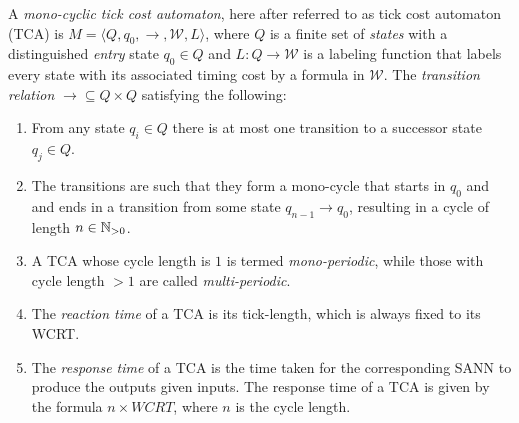\begin{definition}
	A \emph{mono-cyclic tick cost automaton}, here after referred to as tick cost automaton (\ac{TCA}) 
	is %
	$M = \langle Q, q_0, \rightarrow, \mathcal{W}, L
	\rangle$, where $Q$ is a finite set of \emph{states} with a
	distinguished \emph{entry} state $q_0 \in Q$ and $L: Q \rightarrow \mathcal{W}$ is
	a labeling function that labels every state with its associated timing cost by a formula in $\mathcal{W}$.
	The \emph{transition relation}
	${\rightarrow} \subseteq Q \times Q$ satisfying the following:
	
	\begin{enumerate}
		\item From any state $q_i \in Q$ there is at most one transition to a successor state $q_j \in Q$.
		\item The transitions are such that they form a mono-cycle that starts in $q_0$ and and ends in a 
		transition from some state $q_{n-1} \rightarrow q_0$, resulting in a
		cycle of length $n \in {\mathbb N}_{>0}$.
		\item A \ac{TCA} whose cycle length is $1$ is termed
		\emph{mono-periodic}, while those with cycle length $>1$ are called
		\emph{multi-periodic}.
		\item The \emph{reaction time} of a \ac{TCA} is its tick-length, which is
		always fixed to its \ac{WCRT}. 
		\item The \emph{response time} of a \ac{TCA} is the time taken for the
		corresponding \ac{SANN} to produce the outputs given inputs. 
		The response time of a TCA is given by the formula $n \times WCRT$,
		where $n$ is the cycle length.
	\end{enumerate}
	\label{def:tca}
\end{definition}

